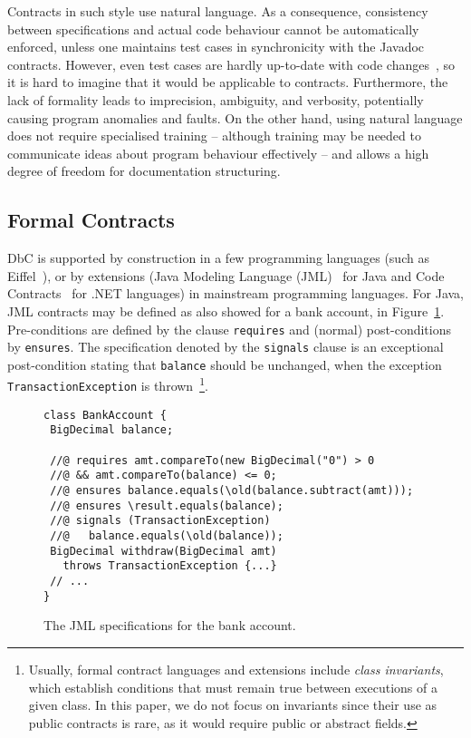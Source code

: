 Contracts in such style use natural language. As a consequence, consistency between specifications and actual code behaviour cannot be automatically enforced, unless one maintains test cases in synchronicity with the Javadoc contracts. However, even test cases are hardly up-to-date with code changes~\cite{Hao2013}, so it is hard to imagine that it would be applicable to contracts. 
Furthermore, the lack of formality leads to imprecision, ambiguity, and verbosity, potentially causing program anomalies and faults.
On the other hand, using natural language does not require specialised training -- although training may be needed to communicate
ideas about program behaviour effectively -- and allows a high degree of freedom for documentation structuring. 


\subsection{Formal Contracts}


DbC is supported by construction in a few programming languages (such as Eiffel~\cite{eiffel}), or by extensions (Java Modeling Language (JML)~\cite{jml} for Java and Code Contracts~\cite{codeContractsPaper} for .NET languages) in mainstream programming languages.
For Java, JML contracts may be defined as also showed for a bank account, in Figure~\ref{Fig-JML-Bank}. Pre-conditions
are defined by the clause {\lstinline!requires!} and (normal) post-conditions by {\lstinline!ensures!}. The specification
denoted by the {\lstinline!signals!} clause
is an exceptional post-condition stating that {\lstinline!balance!} should be unchanged, when the exception \texttt{TransactionExcep\-tion} is thrown~\footnote{Usually, formal contract languages and extensions include \textit{class invariants}, which establish conditions that must remain true between executions of a given class. In this paper, we do not focus on invariants since their use as public contracts is rare, as it would require public or abstract fields.}.

\begin{figure}
\begin{lstlisting}[basicstyle=\footnotesize\ttfamily,name=figxpi]
class BankAccount {
 BigDecimal balance;

 //@ requires amt.compareTo(new BigDecimal("0") > 0 
 //@ && amt.compareTo(balance) <= 0;
 //@ ensures balance.equals(\old(balance.subtract(amt)));
 //@ ensures \result.equals(balance);
 //@ signals (TransactionException) 
 //@   balance.equals(\old(balance));
 BigDecimal withdraw(BigDecimal amt) 
   throws TransactionException {...}
 // ...
}
\end{lstlisting}
\caption{The JML specifications for the bank account.}
\label{Fig-JML-Bank}
\end{figure}

